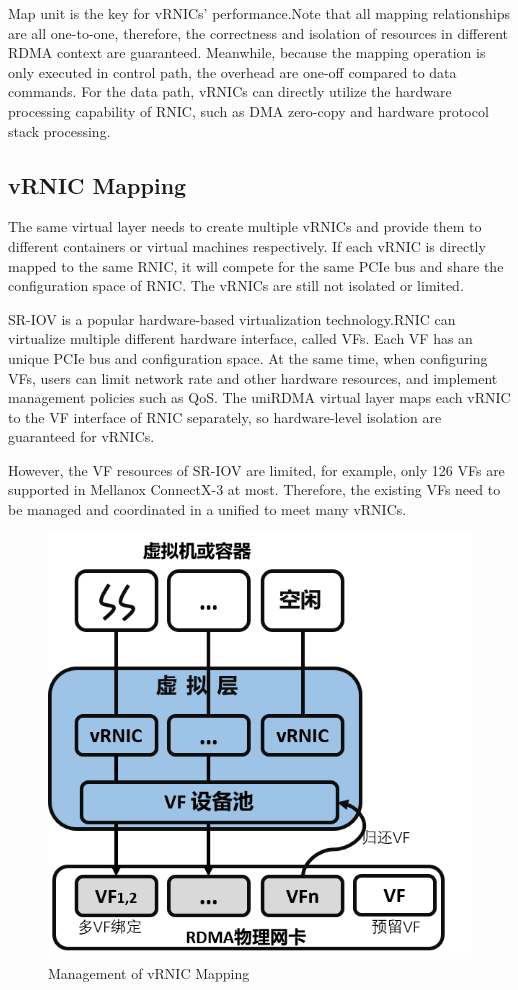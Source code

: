 Map unit is the key for vRNICs' performance.Note that all mapping relationships are all one-to-one, therefore, the correctness and isolation of resources in different RDMA context are guaranteed. Meanwhile, because the mapping operation is only executed in control path, the overhead are one-off compared to data commands. For the data path, vRNICs can directly utilize the hardware processing capability of RNIC, such as DMA zero-copy and hardware protocol stack processing.

\subsection{vRNIC Mapping}
The same virtual layer needs to create multiple vRNICs and provide them to different containers or virtual machines respectively. If each vRNIC is directly mapped to the same RNIC, it will compete for the same PCIe bus and share the configuration space of RNIC. The vRNICs are still not isolated or limited.

SR-IOV is a popular hardware-based virtualization technology.RNIC can virtualize multiple different hardware interface, called VFs. Each VF has an unique PCIe bus and configuration space. At the same time, when configuring VFs, users can limit network rate and other hardware resources, and implement management policies such as QoS. The uniRDMA virtual layer maps each vRNIC to the VF interface of RNIC separately, so hardware-level isolation are guaranteed for vRNICs.

However, the VF resources of SR-IOV are limited, for example, only 126 VFs are supported in Mellanox ConnectX-3 at most. Therefore, the existing VFs need to be managed and coordinated in a unified to meet many vRNICs.

\begin{figure}[!ht]
	\centering
	\includegraphics[width=1.0\linewidth]{images/vf-mapping}
	\caption{Management of vRNIC Mapping}
	\label{fig:vf-mapping}
\end{figure}

